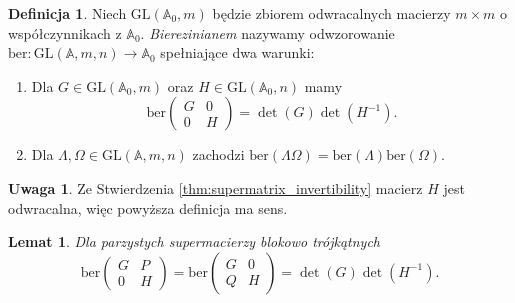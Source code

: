 \documentclass[11pt,a4paper]{report}
\newtheorem{lemma}[theorem]{Lemat}
\theoremstyle{definition}
\newtheorem{definition}[theorem]{Definicja}
\newtheorem{remark}[theorem]{Uwaga}
\newcommand{\ber}{\mathrm{ber}}
\begin{document}
\begin{definition}
	\label{def:berezinian}
	Niech $\mathrm{GL}(\mathbb{A}_0,m)$ będzie zbiorem odwracalnych macierzy $m \times m$ o współczynnikach z $\mathbb{A}_0$. \textit{Bierezinianem} nazywamy odwzorowanie $\ber: \mathrm{GL}(\mathbb{A},m,n) \rightarrow \mathbb{A}_0$ spełniające dwa warunki:
	\begin{enumerate}[(1)]
		\item Dla $G \in \mathrm{GL}(\mathbb{A}_0,m)$ oraz $H \in \mathrm{GL}(\mathbb{A}_0,n)$ mamy $$\ber \left( \begin{matrix}
		      G & 0 \\
		      0 & H
		\end{matrix} \right) = \det(G) \det(H^{-1}).$$
		\item Dla $\Lambda, \Omega \in \mathrm{GL}(\mathbb{A},m,n)$ zachodzi $\ber(\Lambda \Omega) = \ber(\Lambda) \ber(\Omega).$
	\end{enumerate}
\end{definition}

\begin{remark}
	Ze Stwierdzenia \ref{thm:supermatrix_invertibility} macierz $H$ jest odwracalna, więc powyższa definicja ma sens.
\end{remark}

\begin{lemma}
	\label{lem:even_ber}
	Dla parzystych supermacierzy blokowo trójkątnych $$\ber \left( \begin{matrix}
	G & P \\
	0 & H
	\end{matrix} \right) = \ber \left( \begin{matrix}
	G & 0 \\
	Q & H
	\end{matrix} \right) = \det(G)\det(H^{-1}).$$
\end{lemma}
\end{document}
